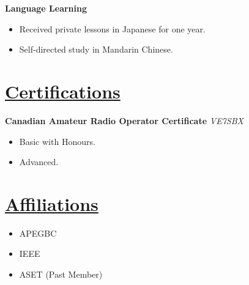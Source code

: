 \documentclass[a4paper, 11pt]{article}
\begin{document}
  \textbf{Language Learning}
  \begin{itemize}[nosep]
    \item Received private lessons in Japanese for one year.
    \item Self-directed study in Mandarin Chinese.
  \end{itemize}

\section{\underline{Certifications}}
  \textbf{Canadian Amateur Radio Operator Certificate}
  \hfill
  \emph{VE7SBX}
  \begin{itemize}[nosep]
    \item Basic with Honours.
    \item Advanced.
  \end{itemize}
      
\section{\underline{Affiliations}}
  \begin{itemize}[nosep]
    \item APEGBC
    \item IEEE
    \item ASET (Past Member)
  \end{itemize}
\end{document}
